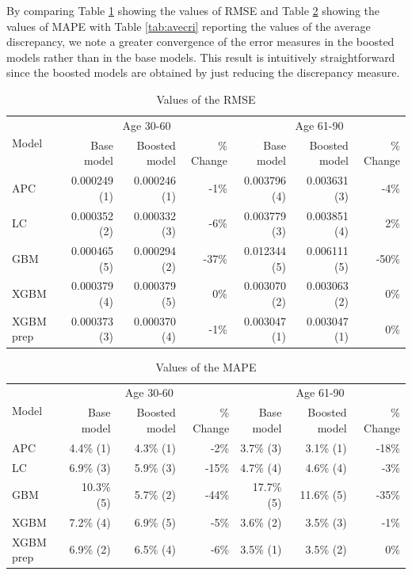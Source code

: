 \documentclass[fleqn,10pt]{wlscirep}
\begin{document}
By comparing Table \ref{tab:rmse} showing the values of RMSE and Table \ref{tab:mape} showing the values of MAPE with Table \ref{tab:avecri} reporting the values of the average discrepancy, we note a greater convergence of the error measures in the boosted models rather than in the base models. This result is intuitively straightforward since the boosted models are obtained by just reducing the discrepancy measure. 
%
\begin{table}[ht]
\centering
\footnotesize
\begin{tabular}{|l|r|r|r|r|r|r|}
\hline
\multirow{2}{*}{Model} & \multicolumn{3}{c|}{Age 30-60} & \multicolumn{3}{c|}{Age 61-90} \\
\cline{2-7}
			&	Base model	&	Boosted model	& \% Change &	Base model	&	Boosted model	& \% Change\\
\hline
APC 			&	0.000249	(1) 	& 0.000246	(1) 	& -1\% 	& 0.003796 	(4) & 0.003631	(3) & -4\%\\
LC 			&	0.000352	(2) 	& 0.000332	(3) 	& -6\% 	& 0.003779 	(3) & 0.003851	(4) & 2\%\\
GBM 		&	0.000465	(5) 	& 0.000294	(2) 	& -37\% 	& 0.012344 	(5) & 0.006111	(5) & -50\%\\
XGBM 		&	0.000379	(4)	& 0.000379	(5) 	& 0\% 	& 0.003070 	(2) & 0.003063	(2) & 0\%\\
XGBM prep 	&	0.000373	(3) 	& 0.000370	(4) 	& -1\% 	& 0.003047 	(1) & 0.003047	(1) & 0\%\\ 
\hline
\end{tabular}
\caption{Values of the RMSE}
\label{tab:rmse}
\end{table}
%
\begin{table}[ht]
\centering
\footnotesize
\begin{tabular}{|l|r|r|r|r|r|r|}
\hline
\multirow{2}{*}{Model} & \multicolumn{3}{c|}{Age 30-60} & \multicolumn{3}{c|}{Age 61-90} \\
\cline{2-7}
			&	Base model	&	Boosted model	& \% Change &	Base model	&	Boosted model	& \% Change\\
\hline
APC 			&	4.4\%	(1) & 4.3\%	(1) 	& -2\% 	& 3.7\%	(3) & 3.1\%	(1) & -18\%\\
LC 			&	6.9\%	(3) & 5.9\%	(3) 	& -15\% 	& 4.7\%	(4) & 4.6\%	(4) & -3\%\\
GBM			&	10.3\%	(5) & 5.7\%	(2) 	& -44\% 	& 17.7\%	(5) & 11.6\%	(5) & -35\%\\
XGBM		&	7.2\%	(4) & 6.9\%	(5) 	& -5\% 	& 3.6\%	(2) & 3.5\%	(3) & -1\%\\
XGBM prep	&	6.9\%	(2) & 6.5\%	(4) 	& -6\% 	& 3.5\%	(1) & 3.5\%	(2) & 0\%\\ 
\hline
\end{tabular}
\caption{Values of the MAPE}
\label{tab:mape}
\end{table}
\end{document}
